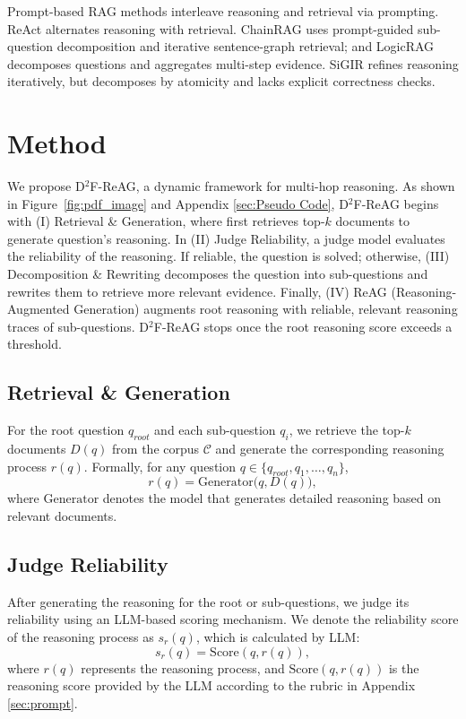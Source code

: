 \documentclass[11pt]{article}
\begin{document}
Prompt-based RAG methods \cite{chang2024efficient} interleave reasoning and retrieval via prompting. 
ReAct \cite{yao2023react} alternates reasoning with retrieval. ChainRAG \cite{zhu-etal-2025-mitigating} uses prompt-guided sub-question decomposition and iterative sentence-graph retrieval; and LogicRAG \cite{chen2025you} decomposes questions and aggregates multi-step evidence. SiGIR \cite{chu-etal-2025-self} refines reasoning iteratively, but decomposes by atomicity and lacks explicit correctness checks.

\section{Method}

We propose D$^2$F-ReAG, a dynamic framework for multi-hop reasoning. As shown in Figure~\ref{fig:pdf_image} and Appendix \ref{sec:Pseudo Code}, D$^2$F-ReAG begins with (I) Retrieval \& Generation, where first retrieves top-$k$ documents to generate question's reasoning. In (II) Judge Reliability, a judge model evaluates the reliability of the reasoning. If reliable, the question is solved; otherwise, (III) Decomposition \& Rewriting decomposes the question into sub-questions and rewrites them to retrieve more relevant evidence. Finally, (IV) ReAG (Reasoning-Augmented Generation) augments root reasoning with reliable, relevant reasoning traces of sub-questions. D$^2$F-ReAG stops once the root reasoning score exceeds a threshold.

\subsection{Retrieval \& Generation}

For the root question $q_{root}$ and each sub-question $q_i$, we retrieve the top-$k$ documents $D(q)$ from the corpus $\mathcal{C}$ and generate the corresponding reasoning process $r(q)$. Formally, for any question $q \in \{q_{root}, q_1, \dots, q_n\}$,
\begin{equation}
r(q) = \mathrm{Generator}\bigl(q, D(q)\bigr),
\end{equation}
where $\mathrm{Generator}$ denotes the model that generates detailed reasoning based on relevant documents.
\subsection{Judge Reliability}
After generating the reasoning for the root or sub-questions, we judge its reliability using an LLM-based scoring mechanism. We denote the reliability score of the reasoning process as \( s_r(q) \), which is calculated by LLM:
\begin{equation}
    s_r(q) = \text{Score}(q, r(q)),
\end{equation}
where \( r(q) \) represents the reasoning process, and \( \text{Score}(q, r(q)) \) is the reasoning score provided by the LLM according to the rubric in Appendix \ref{sec:prompt}.
\end{document}
